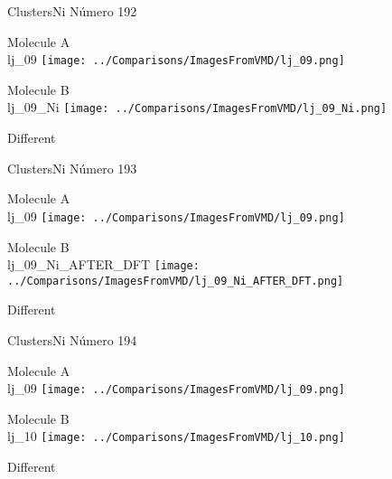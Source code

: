  \newpage

\vtab[-3cm]
\begin{center}
{\large ClustersNi \tab Número 192}
\end{center}
\begin{multicols}{2}
\begin{center}
Molecule A \\ 
lj\_09
\texttt{[image: ../Comparisons/ImagesFromVMD/lj\_09.png]}
\\
\vtab

\columnbreak
Molecule B \\ 
lj\_09\_Ni
\texttt{[image: ../Comparisons/ImagesFromVMD/lj\_09\_Ni.png]}
\\
\vtab


\end{center}
\end{multicols}
\begin{center}
\textcolor{NavyBlue}{\Large Different}
\end{center}

 \newpage

\vtab[-3cm]
\begin{center}
{\large ClustersNi \tab Número 193}
\end{center}
\begin{multicols}{2}
\begin{center}
Molecule A \\ 
lj\_09
\texttt{[image: ../Comparisons/ImagesFromVMD/lj\_09.png]}
\\
\vtab

\columnbreak
Molecule B \\ 
lj\_09\_Ni\_AFTER\_DFT
\texttt{[image: ../Comparisons/ImagesFromVMD/lj\_09\_Ni\_AFTER\_DFT.png]}
\\
\vtab


\end{center}
\end{multicols}
\begin{center}
\textcolor{NavyBlue}{\Large Different}
\end{center}

 \newpage

\vtab[-3cm]
\begin{center}
{\large ClustersNi \tab Número 194}
\end{center}
\begin{multicols}{2}
\begin{center}
Molecule A \\ 
lj\_09
\texttt{[image: ../Comparisons/ImagesFromVMD/lj\_09.png]}
\\
\vtab

\columnbreak
Molecule B \\ 
lj\_10
\texttt{[image: ../Comparisons/ImagesFromVMD/lj\_10.png]}
\\
\vtab


\end{center}
\end{multicols}
\begin{center}
\textcolor{NavyBlue}{\Large Different}
\end{center}


